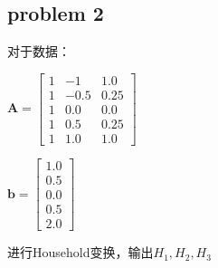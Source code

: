 \documentclass[UTF8]{ctexart}
\begin{document}
\subsection{problem 2}


对于数据：

$\mathbf{A}=\left[\begin{array}{ccc}{1} & {-1} & {1.0} \\ 
									{1} & {-0.5} & {0.25} \\ 
									{1} & {0.0} & {0.0} \\ 
									{1} & {0.5} & {0.25} \\
									 {1} & {1.0} & {1.0}\end{array}\right]$


$ \mathbf{b}=\left[\begin{array}{l}{1.0} \\ {0.5} \\ {0.0} \\ {0.5} \\ {2.0}\end{array}\right]$

进行Household变换，输出$H_1,H_2,H_3$
\end{document}
